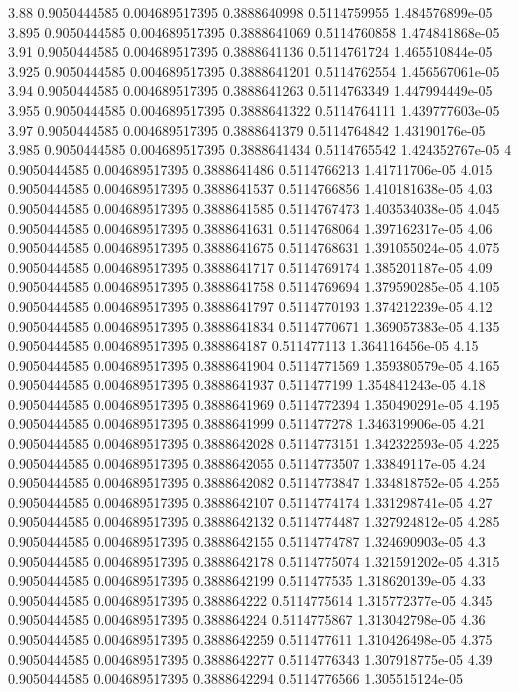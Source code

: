 {3.88 0.9050444585 0.004689517395 0.3888640998 0.5114759955 1.484576899e-05
3.895 0.9050444585 0.004689517395 0.3888641069 0.5114760858 1.474841868e-05
3.91 0.9050444585 0.004689517395 0.3888641136 0.5114761724 1.465510844e-05
3.925 0.9050444585 0.004689517395 0.3888641201 0.5114762554 1.456567061e-05
3.94 0.9050444585 0.004689517395 0.3888641263 0.5114763349 1.447994449e-05
3.955 0.9050444585 0.004689517395 0.3888641322 0.5114764111 1.439777603e-05
3.97 0.9050444585 0.004689517395 0.3888641379 0.5114764842 1.43190176e-05
3.985 0.9050444585 0.004689517395 0.3888641434 0.5114765542 1.424352767e-05
4 0.9050444585 0.004689517395 0.3888641486 0.5114766213 1.41711706e-05
4.015 0.9050444585 0.004689517395 0.3888641537 0.5114766856 1.410181638e-05
4.03 0.9050444585 0.004689517395 0.3888641585 0.5114767473 1.403534038e-05
4.045 0.9050444585 0.004689517395 0.3888641631 0.5114768064 1.397162317e-05
4.06 0.9050444585 0.004689517395 0.3888641675 0.5114768631 1.391055024e-05
4.075 0.9050444585 0.004689517395 0.3888641717 0.5114769174 1.385201187e-05
4.09 0.9050444585 0.004689517395 0.3888641758 0.5114769694 1.379590285e-05
4.105 0.9050444585 0.004689517395 0.3888641797 0.5114770193 1.374212239e-05
4.12 0.9050444585 0.004689517395 0.3888641834 0.5114770671 1.369057383e-05
4.135 0.9050444585 0.004689517395 0.388864187 0.511477113 1.364116456e-05
4.15 0.9050444585 0.004689517395 0.3888641904 0.5114771569 1.359380579e-05
4.165 0.9050444585 0.004689517395 0.3888641937 0.511477199 1.354841243e-05
4.18 0.9050444585 0.004689517395 0.3888641969 0.5114772394 1.350490291e-05
4.195 0.9050444585 0.004689517395 0.3888641999 0.511477278 1.346319906e-05
4.21 0.9050444585 0.004689517395 0.3888642028 0.5114773151 1.342322593e-05
4.225 0.9050444585 0.004689517395 0.3888642055 0.5114773507 1.33849117e-05
4.24 0.9050444585 0.004689517395 0.3888642082 0.5114773847 1.334818752e-05
4.255 0.9050444585 0.004689517395 0.3888642107 0.5114774174 1.331298741e-05
4.27 0.9050444585 0.004689517395 0.3888642132 0.5114774487 1.327924812e-05
4.285 0.9050444585 0.004689517395 0.3888642155 0.5114774787 1.324690903e-05
4.3 0.9050444585 0.004689517395 0.3888642178 0.5114775074 1.321591202e-05
4.315 0.9050444585 0.004689517395 0.3888642199 0.511477535 1.318620139e-05
4.33 0.9050444585 0.004689517395 0.388864222 0.5114775614 1.315772377e-05
4.345 0.9050444585 0.004689517395 0.388864224 0.5114775867 1.313042798e-05
4.36 0.9050444585 0.004689517395 0.3888642259 0.511477611 1.310426498e-05
4.375 0.9050444585 0.004689517395 0.3888642277 0.5114776343 1.307918775e-05
4.39 0.9050444585 0.004689517395 0.3888642294 0.5114776566 1.305515124e-05
}
